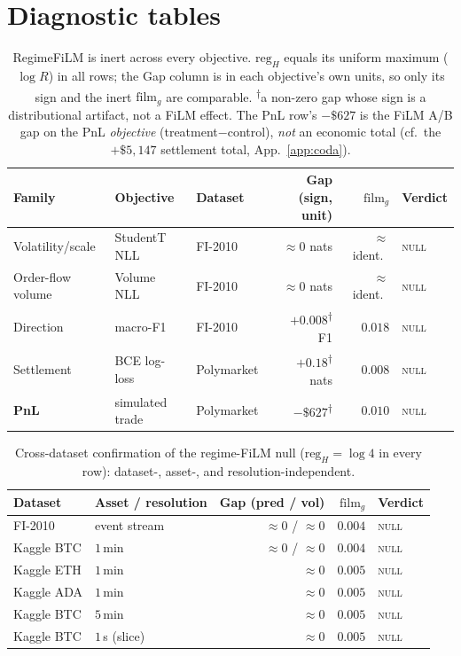 \documentclass{article}
\newcommand{\dg}{\textsuperscript{$\dagger$}}
\begin{document}
\appendix
\section{Diagnostic tables}\label{app:tables}

\begin{table}[h]
\centering
\small
\begin{tabular}{lllrrl}
\toprule
Family & Objective & Dataset & Gap (sign, unit) & $\mathrm{film}_g$ & Verdict \\
\midrule
Volatility/scale & StudentT NLL    & FI-2010    & $\approx 0$ nats & $\approx$ ident.\ & \textsc{null} \\
Order-flow volume & Volume NLL     & FI-2010    & $\approx 0$ nats & $\approx$ ident.\ & \textsc{null} \\
Direction        & macro-F1        & FI-2010    & $+0.008$\dg\ F1 & $0.018$ & \textsc{null} \\
Settlement       & BCE log-loss    & Polymarket & $+0.18$\dg\ nats  & $0.008$ & \textsc{null} \\
\textbf{PnL}     & simulated trade & Polymarket & $-\$627$\dg   & $0.010$ & \textsc{null} \\
\bottomrule
\end{tabular}
\caption{RegimeFiLM is inert across every objective. $\mathrm{reg}_H$ equals its
uniform maximum ($\log R$) in all rows; the Gap column is in each objective's own
units, so only its sign and the inert $\mathrm{film}_g$ are comparable.
\textsuperscript{$\dagger$}a non-zero gap whose sign is a distributional artifact,
not a FiLM effect. The PnL row's $-\$627$ is the FiLM A/B gap on the PnL
\emph{objective} (treatment$-$control), \emph{not} an economic total (cf.\ the
$+\$5{,}147$ settlement total, App.~\ref{app:coda}).}
\label{tab:film_null}
\end{table}

\begin{table}[h]
\centering
\small
\begin{tabular}{llrrl}
\toprule
Dataset & Asset / resolution & Gap (pred / vol) & $\mathrm{film}_g$ & Verdict \\
\midrule
FI-2010      & event stream          & $\approx 0$ / $\approx 0$ & $0.004$ & \textsc{null} \\
Kaggle BTC   & $1\,$min      & $\approx 0$ / $\approx 0$ & $0.004$ & \textsc{null} \\
Kaggle ETH   & $1\,$min      & $\approx 0$               & $0.005$ & \textsc{null} \\
Kaggle ADA   & $1\,$min      & $\approx 0$               & $0.005$ & \textsc{null} \\
Kaggle BTC   & $5\,$min      & $\approx 0$               & $0.005$ & \textsc{null} \\
Kaggle BTC   & $1\,$s (slice)& $\approx 0$               & $0.005$ & \textsc{null} \\
\bottomrule
\end{tabular}
\caption{Cross-dataset confirmation of the regime-FiLM null
($\mathrm{reg}_H=\log 4$ in every row): dataset-, asset-, and
resolution-independent.}
\label{tab:film_null_xdata}
\end{table}
\end{document}
